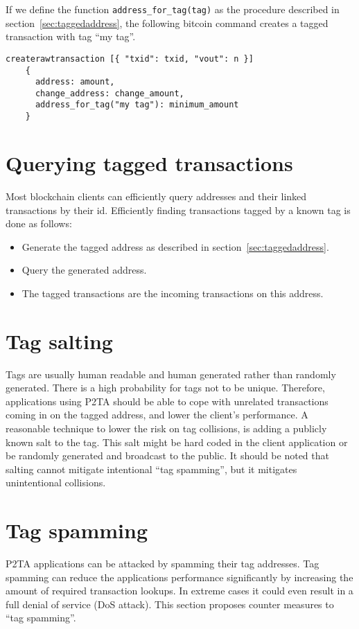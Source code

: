 \documentclass[a4paper,10pt]{article}
\begin{document}
If we define the function \verb|address_for_tag(tag)| as the procedure described in section~\ref{sec:taggedaddress}, the following bitcoin command creates a tagged transaction with tag ``my tag''.
\begin{small}\begin{verbatim}
createrawtransaction [{ "txid": txid, "vout": n }]
    {
      address: amount,
      change_address: change_amount,
      address_for_tag("my tag"): minimum_amount
    }
\end{verbatim}\end{small}


\section{Querying tagged transactions}
Most blockchain clients can efficiently query addresses and their linked transactions by their id.
Efficiently finding transactions tagged by a known tag is done as follows:
\begin{itemize}
 \item Generate the tagged address as described in section~\ref{sec:taggedaddress}.
 \item Query the generated address.
 \item The tagged transactions are the incoming transactions on this address.
\end{itemize}


\section{Tag salting}
Tags are usually human readable and human generated rather than randomly generated.
There is a high probability for tags not to be unique.
Therefore, applications using P2TA should be able to cope with unrelated transactions coming in on the tagged address, and lower the client's performance.
A reasonable technique to lower the risk on tag collisions, is adding a publicly known salt to the tag.
This salt might be hard coded in the client application or be randomly generated and broadcast to the public.
It should be noted that salting cannot mitigate intentional ``tag spamming'', but it mitigates unintentional collisions.


\section{Tag spamming}
P2TA applications can be attacked by spamming their tag addresses.
Tag spamming can reduce the applications performance significantly by increasing the amount of required transaction lookups.
In extreme cases it could even result in a full denial of service (DoS attack).
This section proposes counter measures to ``tag spamming''.
\end{document}
